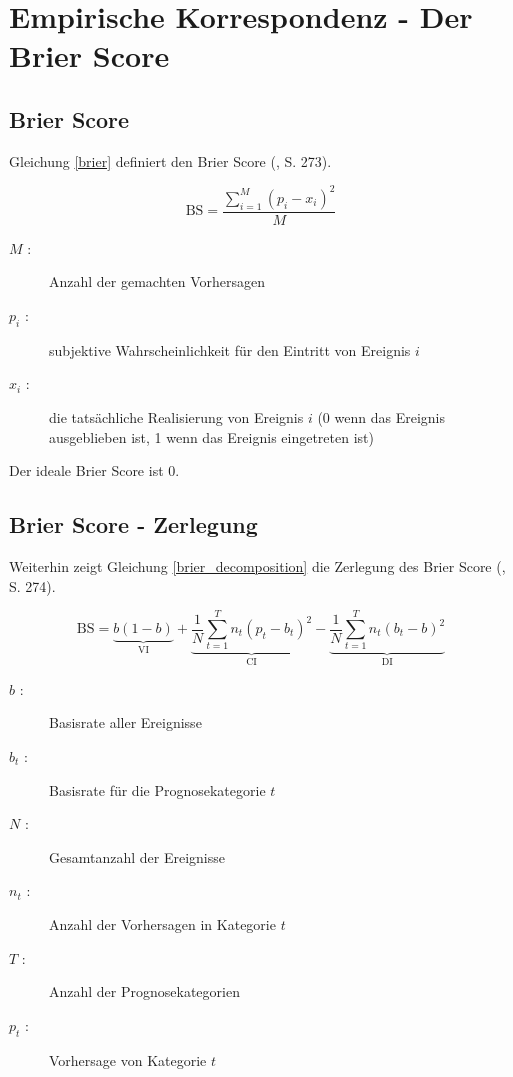 \section{Empirische Korrespondenz - Der Brier Score} \label{Anhang_Brier}

\subsection{Brier Score}

Gleichung \ref{brier} definiert den Brier Score (\cite{Tetlock}, S. 273).

\begin{equation}
\textrm{BS} = \frac{\sum_{i=1}^{M} (p_i - x_i)^2}{ M }
\label{brier}
\end{equation}

\begin{description}
\item[$M$ :] Anzahl der gemachten Vorhersagen
\item[$p_i$ :] subjektive Wahrscheinlichkeit für den Eintritt von Ereignis $i$
\item[$x_i$ :] die tatsächliche Realisierung von Ereignis $i$ (0 wenn das Ereignis ausgeblieben ist, 1 wenn das Ereignis eingetreten ist)
\end{description}

Der ideale Brier Score ist 0.

\subsection{Brier Score - Zerlegung}

Weiterhin zeigt Gleichung \ref{brier_decomposition} die Zerlegung des Brier Score (\cite{Tetlock}, S. 274).

\begin{equation}
\textrm{BS} = \underbrace{
b(1-b)
}_\textrm{VI} + \underbrace{
\frac{1}{N} \sum_{t=1}^{T} n_t (p_t - b_t)^2
}_\textrm{CI} - \underbrace{
\frac{1}{N} \sum_{t=1}^{T} n_t (b_t - b)^2
}_\textrm{DI}
\label{brier_decomposition}
\end{equation}

\begin{description}
\item[$b$ :] Basisrate aller Ereignisse
\item[$b_t$ :] Basisrate für die Prognosekategorie $t$
\item[$N$ :] Gesamtanzahl der Ereignisse
\item[$n_t$ :] Anzahl der Vorhersagen in Kategorie $t$
\item[$T$ :] Anzahl der Prognosekategorien
\item[$p_t$ :] Vorhersage von Kategorie $t$
\end{description}

